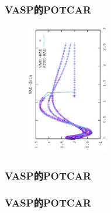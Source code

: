 \frame
{
	\frametitle{\rm{VASP}的\rm{POTCAR}}
\begin{minipage}{0.58\textwidth}
\centering
\vspace{-0.10in}
\fontsize{3.3pt}{1.9pt}\selectfont{
}
\end{minipage}
\hfill
\begin{minipage}{0.40\textwidth}
\begin{figure}[t!]
\centering
\vspace{-0.05in}
\includegraphics[height=2.25in,width=1.4in,viewport=0 0 350 550, angle=-90, clip]{Figures/WAE-data.eps}
\label{Wave-AE_Function}
\end{figure}
\end{minipage}
}

\frame
{
	\frametitle{\rm{VASP}的\rm{POTCAR}}
\centering
\vspace{-0.15in}
\fontsize{3.3pt}{1.9pt}\selectfont{
}
}

\frame
{
	\frametitle{\rm{VASP}的\rm{POTCAR}}
\centering
\vspace{-0.15in}
\fontsize{3.3pt}{1.9pt}\selectfont{
}
}

